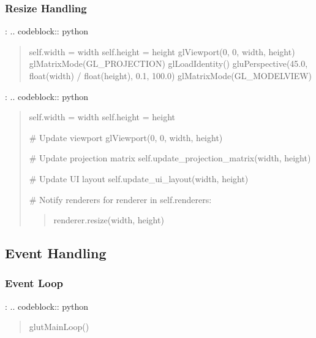 \documentclass[a4paper,10pt,english,openany,oneside]{sphinxmanual}
\begin{document}
\subsubsection{Resize Handling}
\label{\detokenize{api/ui:resize-handling}}
\sphinxAtStartPar
{}:
.. code\sphinxhyphen{}block:: python
\begin{quote}
\begin{description}
\sphinxAtStartPar
self.width = width
self.height = height
glViewport(0, 0, width, height)
glMatrixMode(GL\_PROJECTION)
glLoadIdentity()
gluPerspective(45.0, float(width) / float(height), 0.1, 100.0)
glMatrixMode(GL\_MODELVIEW)

\end{description}
\end{quote}

\sphinxAtStartPar
{}:
.. code\sphinxhyphen{}block:: python
\begin{quote}
\begin{description}
\sphinxAtStartPar
self.width = width
self.height = height

\sphinxAtStartPar
\# Update viewport
glViewport(0, 0, width, height)

\sphinxAtStartPar
\# Update projection matrix
self.update\_projection\_matrix(width, height)

\sphinxAtStartPar
\# Update UI layout
self.update\_ui\_layout(width, height)

\sphinxAtStartPar
\# Notify renderers
for renderer in self.renderers:
\begin{quote}

\sphinxAtStartPar
renderer.resize(width, height)
\end{quote}

\end{description}
\end{quote}


\subsection{Event Handling}
\label{\detokenize{api/ui:event-handling}}

\subsubsection{Event Loop}
\label{\detokenize{api/ui:event-loop}}
\sphinxAtStartPar
{}:
.. code\sphinxhyphen{}block:: python
\begin{quote}
\begin{description}
\sphinxAtStartPar
glutMainLoop()

\end{description}
\end{quote}
\end{document}
